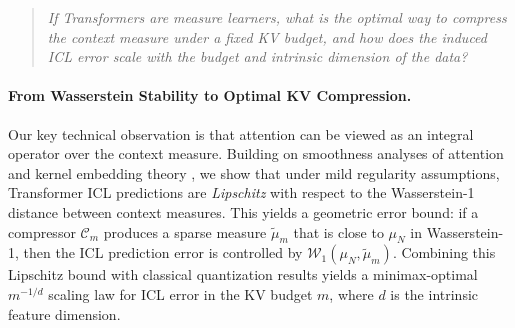 \documentclass{article}
\theoremstyle{plain}
\theoremstyle{definition}
\theoremstyle{remark}
\begin{document}
\begin{quote}
\emph{If Transformers are measure learners, what is the optimal way to compress the context measure under a fixed KV budget, and how does the induced ICL error scale with the budget and intrinsic dimension of the data?}
\end{quote}

\paragraph{From Wasserstein Stability to Optimal KV Compression.}
Our key technical observation is that attention can be viewed as an integral operator over the context measure. Building on smoothness analyses of attention \citep{castin2024how,sander2022sinkformers} and kernel embedding theory \citep{muandet2017kernel,sriperumbudur2010hilbert}, we show that under mild regularity assumptions, Transformer ICL predictions are \emph{Lipschitz} with respect to the Wasserstein-1 distance between context measures. This yields a geometric error bound: if a compressor $\mathcal{C}_m$ produces a sparse measure $\tilde{\mu}_m$ that is close to $\mu_N$ in Wasserstein-1, then the ICL prediction error is controlled by $\mathcal{W}_1(\mu_N,\tilde{\mu}_m)$. Combining this Lipschitz bound with classical quantization results \citep{graf2000foundations,villani2009optimal} yields a minimax-optimal $m^{-1/d}$ scaling law for ICL error in the KV budget $m$, where $d$ is the intrinsic feature dimension.
\end{document}
